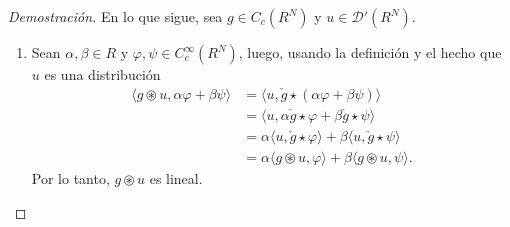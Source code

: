 \documentclass[10pt,a4paper]{report}
\theoremstyle{definition}
\renewcommand{\theproblem}{\Alph{problem}}
\numberwithin{equation}{problem}
\begin{document}
    \begin{proof}[\textcolor{rojo}{Demostración}] En lo que sigue, sea $g\in C_{c}(R^{N})$ y $u\in\mathcal{D}'(R^{N})$.
    	\begin{enumerate}[label=\textbf{\theproblem.\arabic{*}.},ref=\theproblem.\arabic{*},parsep=1ex]
    		\item Sean $\alpha,\beta\in R$ y $\varphi,\psi\in C_{c}^{\infty}(R^{N})$, luego, usando la definición y el hecho que $u$ es una distribución
    		\begin{align*}
    			\langle g\circledast u, \alpha\varphi + \beta\psi \rangle &= \langle u, \check{g}\star\left(\alpha\varphi+\beta\psi\right)   \rangle\\ &= \langle u, \alpha\check{g}\star\varphi + \beta\check{g}\star\psi \rangle\\ &= \alpha\langle u,\check{g}\star\varphi \rangle + \beta\langle u,\check{g}\star\psi \rangle\\ &= \alpha\langle g\circledast u, \varphi \rangle + \beta\langle g\circledast u,\psi \rangle.
    		\end{align*}
    	   Por lo tanto, $g\circledast u$ es lineal.\hspace{0.2cm}
    	   

\end{enumerate}
\end{proof}
\end{document}
